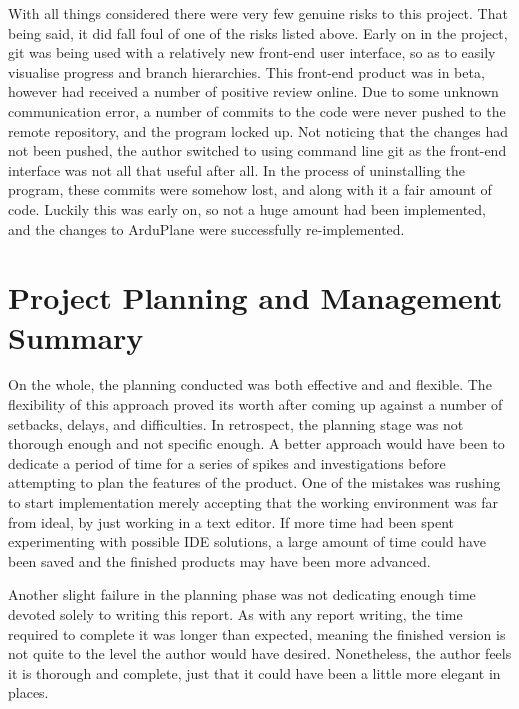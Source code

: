 With all things considered there were very few genuine risks to this project. That being said, it did fall foul of one of the risks listed above. Early on in the project, git was being used with a relatively new front-end user interface, so as to easily visualise progress and branch hierarchies. This front-end product was in beta, however had received a number of positive review online. Due to some unknown communication error, a number of commits to the code were never pushed to the remote repository, and the program locked up. Not noticing that the changes had not been pushed, the author switched to using command line git as the front-end interface was not all that useful after all. In the process of uninstalling the program, these commits were somehow lost, and along with it a fair amount of code. Luckily this was early on, so not a huge amount had been implemented, and the changes to ArduPlane were successfully re-implemented.

\section{Project Planning and Management Summary}
\label{planning:summary}

On the whole, the planning conducted was both effective and and flexible. The flexibility of this approach proved its worth after coming up against a number of setbacks, delays, and difficulties. In retrospect, the planning stage was not thorough enough and not specific enough. A better approach would have been to dedicate a period of time for a series of spikes and investigations before attempting to plan the features of the product. One of the mistakes was rushing to start implementation merely accepting that the working environment was far from ideal, by just working in a text editor. If more time had been spent experimenting with possible IDE solutions, a large amount of time could have been saved and the finished products may have been more advanced. 

Another slight failure in the planning phase was not dedicating enough time devoted solely to writing this report. As with any report writing, the time required to complete it was longer than expected, meaning the finished version is not quite to the level the author would have desired. Nonetheless, the author feels it is thorough and complete, just that it could have been a little more elegant in places.

